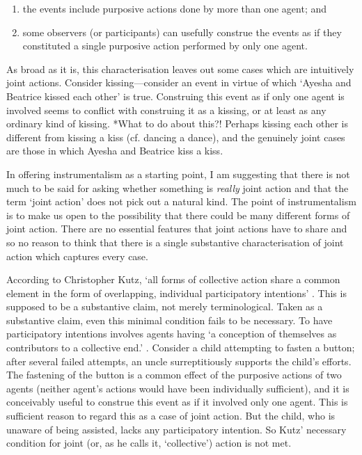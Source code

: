 \documentclass[12pt]{amsart}
\begin{document}
\begin{enumerate}
\item the events include purposive actions done by more than one agent; and 
\item some observers (or participants) can usefully construe the events as if they constituted a single purposive action performed by only one agent.
\end{enumerate}

As broad as it is, this characterisation leaves out some cases which are intuitively joint actions.  Consider kissing---consider an event in virtue of which `Ayesha and Beatrice kissed each other' is true.  Construing this event as if only one agent is involved seems to conflict with construing it as a kissing, or at least as any ordinary kind of kissing.  *What to do about this?!  Perhaps kissing each other is different from kissing a kiss (cf. dancing a dance), and the genuinely joint cases are those in which Ayesha and Beatrice kiss a kiss.

In offering instrumentalism as a starting point, I am suggesting that there is not much to be said for asking whether something is \emph{really} joint action and that the term `joint action' does not pick out a natural kind.  The point of instrumentalism is to make us open to the possibility that there could be many different forms of joint action.  There are no essential features that joint actions have to share and so no reason to think that there is a single substantive characterisation of joint action which captures every case.  

According to Christopher Kutz, `all forms of collective action share a common element in the form of overlapping, individual participatory intentions' \citep[4]{Kutz:2000si}.  This is supposed to be a substantive claim, not merely terminological.  Taken as a substantive claim, even this minimal condition fails to be necessary.  To have participatory intentions involves agents having `a conception of themselves as contributors to a collective end.' \citep[10]{Kutz:2000si}.  Consider a child attempting to fasten a button; after several failed attempts, an uncle surreptitiously supports the child's efforts.  The fastening of the button is a common effect of the purposive actions of two agents (neither agent's actions would have been individually sufficient), and it is conceivably useful to construe this event as if it involved only one agent.  This is sufficient reason to regard this as a case of joint action.  But the child, who is unaware of being assisted, lacks any participatory intention.  So Kutz' necessary condition for joint (or, as he calls it, `collective') action is not met.  
\end{document}
